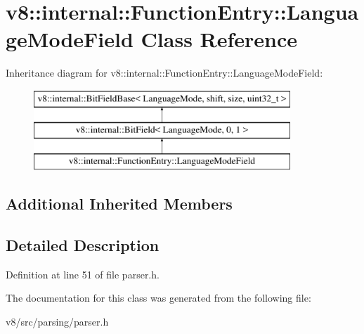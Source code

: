 \hypertarget{classv8_1_1internal_1_1FunctionEntry_1_1LanguageModeField}{}\section{v8\+:\+:internal\+:\+:Function\+Entry\+:\+:Language\+Mode\+Field Class Reference}
\label{classv8_1_1internal_1_1FunctionEntry_1_1LanguageModeField}
Inheritance diagram for v8\+:\+:internal\+:\+:Function\+Entry\+:\+:Language\+Mode\+Field\+:\begin{figure}[H]
\begin{center}
\leavevmode
\includegraphics[height=3.000000cm]{classv8_1_1internal_1_1FunctionEntry_1_1LanguageModeField}
\end{center}
\end{figure}
\subsection*{Additional Inherited Members}


\subsection{Detailed Description}


Definition at line 51 of file parser.\+h.



The documentation for this class was generated from the following file\+:\begin{DoxyCompactItemize}
\item 
v8/src/parsing/parser.\+h\end{DoxyCompactItemize}
